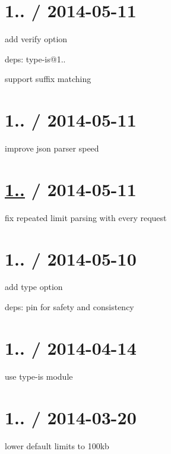 \section*{1.. / 2014-\/05-\/11 }


\begin{DoxyItemize}
\item add {\ttfamily verify} option
\item deps\+: type-\/is@1..
\begin{DoxyItemize}
\item support suffix matching
\end{DoxyItemize}
\end{DoxyItemize}

\section*{1.. / 2014-\/05-\/11 }


\begin{DoxyItemize}
\item improve json parser speed
\end{DoxyItemize}

\section*{\hyperlink{namespace1_1_11_1_11}{1..} / 2014-\/05-\/11 }


\begin{DoxyItemize}
\item fix repeated limit parsing with every request
\end{DoxyItemize}

\section*{1.. / 2014-\/05-\/10 }


\begin{DoxyItemize}
\item add {\ttfamily type} option
\item deps\+: pin for safety and consistency
\end{DoxyItemize}

\section*{1.. / 2014-\/04-\/14 }


\begin{DoxyItemize}
\item use {\ttfamily type-\/is} module
\end{DoxyItemize}

\section*{1.. / 2014-\/03-\/20 }


\begin{DoxyItemize}
\item lower default limits to 100kb 
\end{DoxyItemize}